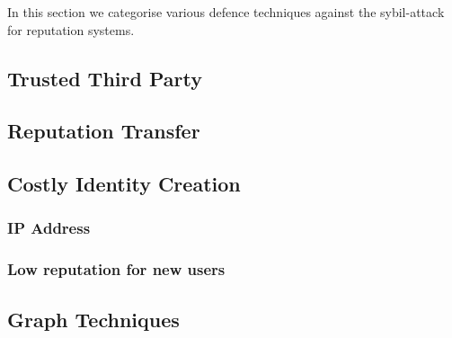 In this section we categorise various defence techniques against the
sybil-attack for reputation systems.

\subsection{Trusted Third Party}\label{sec:trusted_party}

\subsection{Reputation Transfer}

\subsection{Costly Identity Creation}\label{sec:costly_id}
\subsubsection{IP Address}
\subsubsection{Low reputation for new users}

\subsection{Graph Techniques}\label{sec:graph}


